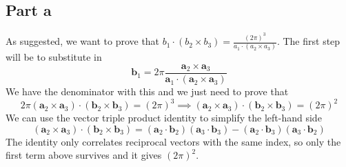 \documentclass[12pt]{article}
\begin{document}
\subsection{Part a}
As suggested, we want to prove that $b_1 \cdot\left(b_2 \times b_3\right)=\frac{(2 \pi)^3}{a_1 \cdot\left(a_2 \times a_3\right)}$. The first step will be to substitute in 
\begin{equation}
\mathbf{b}_1=2 \pi \frac{\mathbf{a}_2 \times \mathbf{a}_3}{\mathbf{a}_1 \cdot\left(\mathbf{a}_2 \times \mathbf{a}_3\right)}
\end{equation}
We have the denominator with this and we just need to prove that
\begin{equation}
    2 \pi (\mathbf{a}_2 \times \mathbf{a}_3) \cdot\left(\mathbf{b}_2 \times \mathbf{b}_3\right)=(2 \pi)^3 \implies (\mathbf{a}_2 \times \mathbf{a}_3) \cdot\left(\mathbf{b}_2 \times \mathbf{b}_3\right)=(2 \pi)^2
\end{equation}
We can use the vector triple product identity to simplify the left-hand side
\begin{equation}
    (\mathbf{a}_2 \times \mathbf{a}_3) \cdot\left(\mathbf{b}_2 \times \mathbf{b}_3\right) = (\mathbf{a}_2 \cdot \mathbf{b}_2)(\mathbf{a}_3 \cdot \mathbf{b}_3) - (\mathbf{a}_2 \cdot \mathbf{b}_3)(\mathbf{a}_3 \cdot \mathbf{b}_2)
\end{equation}
The identity only correlates reciprocal vectors with the same index, so only the first term above survives and it gives $(2\pi)^2$.
\end{document}
